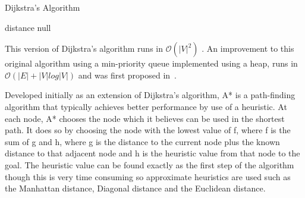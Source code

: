 \begin{algorithm}
\caption{Dijkstra's Algorithm}
\label{alg:Djikstra}
\begin{algorithmic}
\ENDFOR
{}
\REPEAT
  	\RETURN distance
  \ENDIF
    \RETURN null
  \ENDIF
  
    \ENDIF
  \ENDFOR
  
\end{algorithmic}
\end{algorithm}

This version of Dijkstra's algorithm runs in $\mathcal{O}(|V|^{2})$ 
\cite{xu2007improved}. An improvement to this original algorithm using a 
min-priority queue implemented using a heap, runs in $\mathcal{O}
(|E| + |V|log |V|)$ and was first proposed in~\cite{fredman1987fibonacci}.


Developed initially as an extension of Dijkstra's algorithm, A* is a 
path-finding algorithm that typically achieves better performance by 
use of a heuristic. At each node, A* chooses the node which it believes 
can be used in the shortest path. It does so by choosing the node with 
the lowest value of f, where f is the sum of g and h, where g is the 
distance to the current node plus the known distance to that adjacent 
node and h is the heuristic value from that node to the goal. The heuristic 
value can be found exactly as the first step of the algorithm though 
this is very time consuming so approximate heuristics are used such 
as the Manhattan distance, Diagonal distance and the Euclidean distance. 
